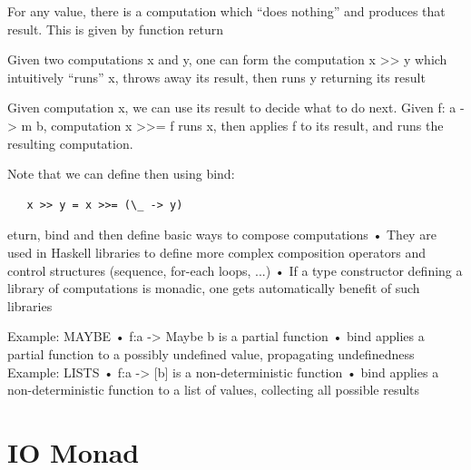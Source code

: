 For any value, there is a computation which “does nothing” and
produces that result. This is given by function return

Given two computations x and y, one can form the computation
x >> y which intuitively “runs” x, throws away its result, then runs
y returning its result

Given computation x, we can use its result to decide what to do next.
Given f: a -> m b, computation x >>= f runs x, then applies
f to its result, and runs the resulting computation.

Note that we can define then using bind:
\begin{lstlisting}
   x >> y = x >>= (\_ -> y)
\end{lstlisting}


eturn, bind and then define basic ways to compose computations
• They are used in Haskell libraries to define more complex composition
operators and control structures (sequence, for-each loops, ...)
• If a type constructor defining a library of computations is monadic, one
gets automatically benefit of such libraries

Example: MAYBE
• f:a -> Maybe b is a partial function
• bind applies a partial function to a possibly undefined value, propagating
undefinedness
Example: LISTS
• f:a -> [b] is a non-deterministic function
• bind applies a non-deterministic function to a list of values, collecting all
possible results

\section{IO Monad}
